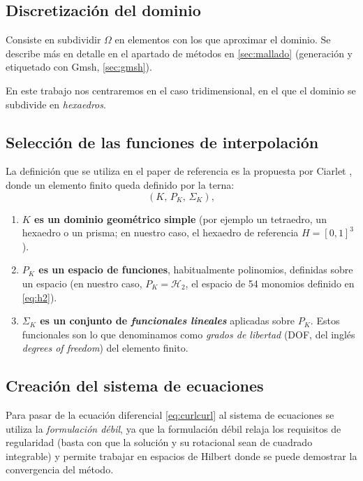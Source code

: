 \documentclass[12pt]{report} %
\begin{document}
\subsection{Discretización del dominio}\label{subsec:mef-discretizacion}
Consiste en subdividir $\Omega$ en elementos con los que aproximar el dominio. Se describe más en detalle en el apartado de métodos en \autoref{sec:mallado} (generación y etiquetado con Gmsh, \autoref{sec:gmsh}).

En este trabajo nos centraremos en el caso tridimensional, en el que el dominio se subdivide en \emph{hexaedros}.

\subsection{Selección de las funciones de interpolación}\label{subsec:mef-interpolacion}
La definición que se utiliza en el paper de referencia \cite{amor2023hexahedral} es la propuesta por Ciarlet \cite{ciarlet2002}, donde un elemento finito queda definido por la terna:
\begin{equation}\label{eq:terna-ciarlet}
	(K,\, P_K,\, \Sigma_K),
\end{equation}
\begin{enumerate}
	\item \textbf{$K$ es un dominio geométrico simple} (por ejemplo un tetraedro, un hexaedro o un prisma; en nuestro caso, el hexaedro de referencia $H=[0,1]^3$).
	\item \textbf{$P_K$ es un espacio de funciones}, habitualmente polinomios, definidas sobre un espacio (en nuestro caso, $P_K=\mathcal{H}_2$, el espacio de 54 monomios definido en \eqref{eq:h2}).
	\item \textbf{$\Sigma_K$ es un conjunto de \emph{funcionales lineales}} aplicadas sobre $P_K$. Estos funcionales son lo que denominamos como  \emph{grados de libertad} (DOF, del inglés \emph{degrees of freedom}) del elemento finito.
\end{enumerate}

\subsection{Creación del sistema de ecuaciones}\label{subsec:mef-sistema}
Para pasar de la ecuaci\'on diferencial \eqref{eq:curlcurl} al sistema de ecuaciones se utiliza la \emph{formulaci\'on d\'ebil}, ya que la formulación débil relaja los requisitos de regularidad (basta con que la solución y su rotacional sean de cuadrado integrable) y permite trabajar en espacios de Hilbert donde se puede demostrar la convergencia del método.
\end{document}
